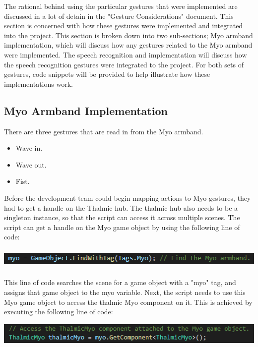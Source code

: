 \documentclass{article}
\begin{document}
\bigskip
The rational behind using the particular gestures that were implemented are discussed in a lot of detain in the "Gesture Considerations" document. This section is concerned with how these gestures were implemented and integrated into the project. This section is broken down into two sub-sections; Myo armband implementation, which will discuss how any gestures related to the Myo armband were implemented. The speech recognition and implementation will discuss how the speech recognition gestures were integrated to the project. For both sets of gestures, code snippets will be provided to help illustrate how these implementations work.

\subsection{Myo Armband Implementation}
There are three gestures that are read in from the Myo armband. 

\begin{itemize}
    \item Wave in.
    \item Wave out.
    \item Fist.
\end{itemize}

Before the development team could begin mapping actions to Myo gestures, they had to get a handle on the Thalmic hub. The thalmic hub also needs to be a singleton instance, so that the script can access it across multiple scenes. The script can get a handle on the Myo game object by using the following line of code:

\bigskip

\includegraphics[width=\textwidth, height=30pt]{img/MyoGameObject.PNG}

\bigskip

This line of code searches the scene for a game object with a "myo" tag, and assigns that game object to the myo variable. Next, the script needs to use this Myo game object to access the thalmic Myo component on it. This is achieved by executing the following line of code:

\bigskip

\includegraphics[width=\textwidth, height=30pt]{img/Thalmic.PNG}
\end{document}
